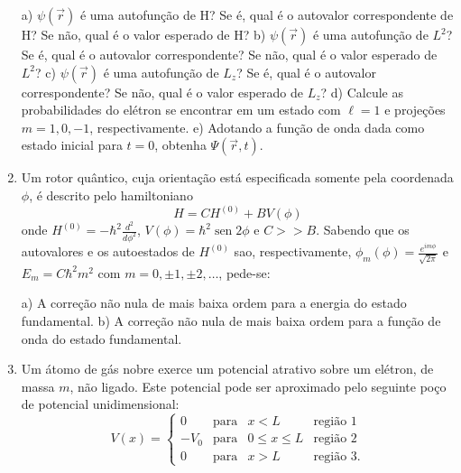\begin{enumerate}[start=1,label={\bfseries Q\arabic*.}]
  a) $\psi(\vec{r})$ é uma autofunção de H? Se é, qual é o autovalor correspondente de H? Se não, qual é o valor esperado de H?
  b) $\psi(\vec{r})$ é uma autofunção de $L^{2}$? Se é, qual é o autovalor correspondente? Se não, qual é o valor esperado de $L^{2}$?
  c) $\psi(\vec{r})$ é uma autofunção de $L_{z}$? Se é, qual é o autovalor correspondente? Se não, qual é o valor esperado de $L_{z}$?
  d) Calcule as probabilidades do elétron se encontrar em um estado com $\ell = 1$ e projeções $m = 1, 0,-1$, respectivamente.
  e) Adotando a função de onda dada como estado inicial para $t=0$, obtenha $\Psi(\vec{r},t)$.




\item Um rotor quântico, cuja orientação está especificada somente pela coordenada $\phi$, é descrito pelo hamiltoniano
$$
H = CH^{(0)} + BV(\phi)
$$
onde $H^{(0)} = -\hbar^{2} \frac{d^{2}}{d \phi^{2}}$, $V(\phi) = \hbar^{2} \operatorname{sen} 2\phi$ e $C>>B$. Sabendo que os autovalores e os autoestados de $H^{(0)}$ sao, respectivamente, $\phi_{m}(\phi) = \frac{e^{i m \phi}}{\sqrt{2\pi}}$ e $E_{m} = C \hbar^{2} m^{2}$ com $m = 0, \pm 1, \pm 2, \dots$, pede-se:

  a) A correção não nula de mais baixa ordem para a energia do estado fundamental.
  b) A correção não nula de mais baixa ordem para a função de onda do estado fundamental.





\item Um átomo de gás nobre exerce um potencial atrativo sobre um elétron, de massa $m$, não ligado. Este potencial pode ser aproximado pelo seguinte poço de potencial unidimensional:
$$
V(x)=\left\{\begin{array}{cccc}
0 & \mbox{para} & x < L & \mbox{região 1} \\
-V_{0} & \mbox{para} &  0 \leq x \leq  L & \mbox{região 2} \\
0 & \mbox{para} & x > L &  \mbox{região 3}.
\end{array}\right.
$$


\end{enumerate}
